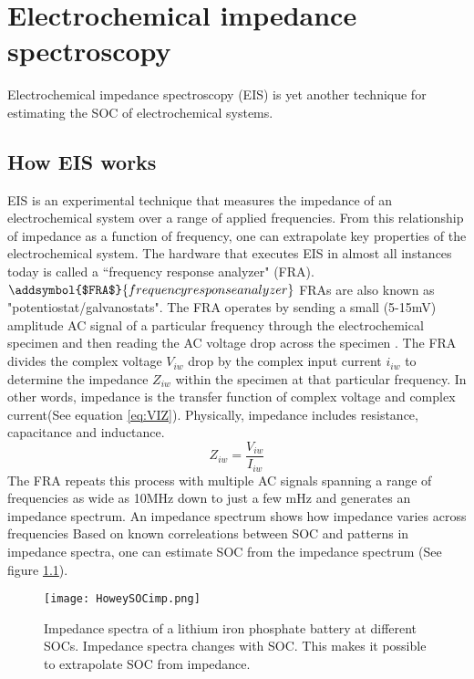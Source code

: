 
\chapter{Electrochemical impedance spectroscopy}
Electrochemical impedance spectroscopy (EIS) is yet another technique for estimating the SOC of electrochemical systems. 

	\section{How EIS works}EIS is an experimental technique that measures the impedance of an electrochemical system over a range of applied frequencies. From this relationship of impedance as a function of frequency,  one can extrapolate key properties of the electrochemical system. The hardware that executes EIS in almost all instances today is called a ``frequency response analyzer" (FRA). $\addsymbol{$FRA$}{frequency response analyzer}$ FRAs are also known as "potentiostat/galvanostats". The FRA operates by sending a small (5-15mV) amplitude AC signal of a particular frequency through the electrochemical specimen and then reading  the AC voltage drop across the specimen \cite{B.V.RatnakumarM.C.Smart2002}. %
The FRA divides the complex voltage $V_{iw}$ drop by the complex input current $i_{iw}$ to determine the impedance $Z_{iw}$\cite{ZBStoynov2009} within the specimen at that particular frequency. In other words, impedance is the transfer function of complex voltage and complex current(See equation \ref{eq:VIZ}). Physically, impedance includes resistance, capacitance and inductance. 
\begin {equation}\label{eq:VIZ}
Z_{iw} = \frac{V_{iw}}{I_{iw}}
\end{equation} 
The FRA repeats this process with multiple AC signals spanning a range of frequencies as wide as 10MHz down to just a few mHz\cite{ZBStoynov2009} and generates an impedance spectrum. An impedance spectrum shows how impedance varies across frequencies 
Based on known correleations between SOC and patterns in impedance spectra, one can estimate SOC from the impedance spectrum (See figure \ref{fig:SOC/Imp}). 
\begin{figure}[H]
\centering
\texttt{[image: HoweySOCimp.png]}
\caption{Impedance spectra of a lithium iron phosphate battery at different SOCs. Impedance spectra changes with SOC. This makes it possible to extrapolate SOC from impedance.
\label{fig:SOC/Imp}
\cite{Howey2014}}
\end{figure}

